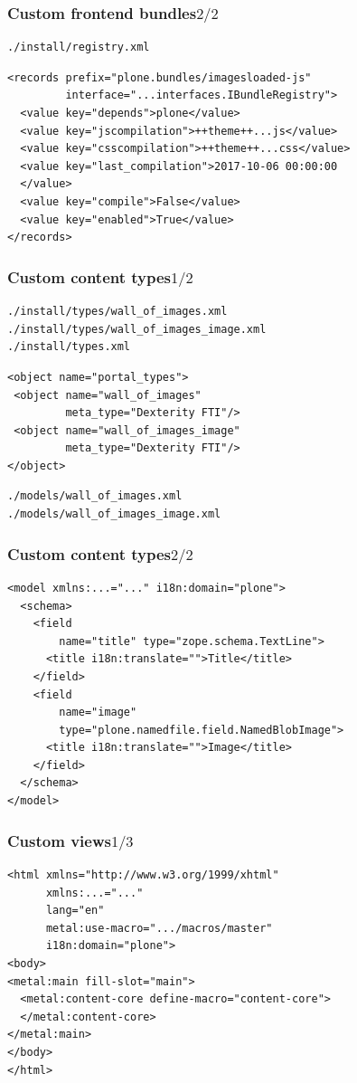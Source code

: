 \documentclass[aspectratio=43]{beamer}
\begin{document}
\begin{frame}
\frametitle{Custom frontend bundles\hfill$2/2$}
\begin{verbatim}
./install/registry.xml
\end{verbatim}
\begin{verbatim}
<records prefix="plone.bundles/imagesloaded-js"
         interface="...interfaces.IBundleRegistry">
  <value key="depends">plone</value>
  <value key="jscompilation">++theme++...js</value>
  <value key="csscompilation">++theme++...css</value>
  <value key="last_compilation">2017-10-06 00:00:00
  </value>
  <value key="compile">False</value>
  <value key="enabled">True</value>
</records>
\end{verbatim}
\end{frame}

\begin{frame}
\frametitle{Custom content types\hfill$1/2$}
\begin{verbatim}
./install/types/wall_of_images.xml
./install/types/wall_of_images_image.xml
./install/types.xml
\end{verbatim}
\begin{verbatim}
<object name="portal_types">
 <object name="wall_of_images"
         meta_type="Dexterity FTI"/>
 <object name="wall_of_images_image"
         meta_type="Dexterity FTI"/>
</object>
\end{verbatim}
\begin{verbatim}
./models/wall_of_images.xml
./models/wall_of_images_image.xml
\end{verbatim}
\end{frame}

\begin{frame}
\frametitle{Custom content types\hfill$2/2$}
\begin{verbatim}
<model xmlns:...="..." i18n:domain="plone">
  <schema>
    <field
        name="title" type="zope.schema.TextLine">
      <title i18n:translate="">Title</title>
    </field>
    <field
        name="image"
        type="plone.namedfile.field.NamedBlobImage">
      <title i18n:translate="">Image</title>
    </field>
  </schema>
</model>
\end{verbatim}
\end{frame}

\begin{frame}
\frametitle{Custom views\hfill$1/3$}
\begin{verbatim}
<html xmlns="http://www.w3.org/1999/xhtml"
      xmlns:...="..."
      lang="en"
      metal:use-macro=".../macros/master"
      i18n:domain="plone">
<body>
<metal:main fill-slot="main">
  <metal:content-core define-macro="content-core">
  </metal:content-core>
</metal:main>
</body>
</html>
\end{verbatim}
\end{frame}
\end{document}
